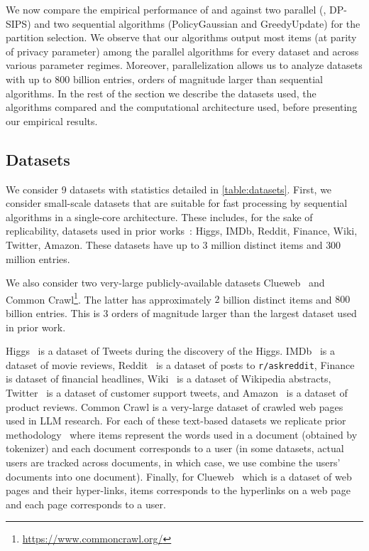 We now compare the empirical performance of \ouralgo{} and \ouralgotworounds{} against two parallel (\basicalgo{}, DP-SIPS) and two sequential algorithms (PolicyGaussian and GreedyUpdate) for the partition selection. We observe that our algorithms output most items (at parity of privacy parameter) among the parallel algorithms for every dataset and across various parameter regimes. Moreover, parallelization allows us to analyze datasets with up to $800$ billion entries, orders of magnitude larger than sequential algorithms. In the rest of the section we describe the datasets used, the algorithms compared and the computational  architecture used, before presenting our empirical results.


\subsection{Datasets}
We consider 9 datasets with statistics detailed in \cref{table:datasets}.
First, we consider small-scale datasets that are suitable for fast processing by sequential algorithms in a single-core architecture. These includes, for the sake of replicability, datasets used in prior works~\cite{gopi2020dpunion, carvalho2022incorporatingitem, swanberg2023dpsips}: Higgs, IMDb, Reddit, Finance, Wiki, Twitter, Amazon. These datasets have up to $3$ million distinct items and $300$ million entries.

We also consider two very-large publicly-available datasets Clueweb~\cite{BRSLLP} and Common Crawl\footnote{\url{https://www.commoncrawl.org/}}. The latter has approximately $2$ billion distinct items and $800$ billion entries. This is $3$ orders of magnitude larger than the largest dataset used in prior work.

Higgs~\cite{snapnets} is a dataset of Tweets during the discovery of the Higgs.
IMDb~\cite{imdb} is a dataset of movie reviews, Reddit~\cite{gopi2020dpunion} is a dataset of posts to \texttt{r/askreddit}, Finance~\cite{finance} is dataset of financial headlines, Wiki~\cite{wiki} is a dataset of Wikipedia abstracts, Twitter~\cite{twitter} is a dataset of customer support tweets, and Amazon~\cite{amazon1, amazon2} is a dataset of product reviews.  Common Crawl is a very-large dataset of crawled web pages used in LLM research.
For each of these text-based datasets we replicate prior methodology~\cite{gopi2020dpunion, carvalho2022incorporatingitem} where items represent the words used in a document (obtained by tokenizer) and each document corresponds to a user (in some datasets, actual users are tracked across documents, in which case, we use combine the users' documents into one document).
Finally, for Clueweb~\cite{BRSLLP} which is a dataset of web pages and their hyper-links, items corresponds to the hyperlinks on a web page and each page corresponds to a user. 



